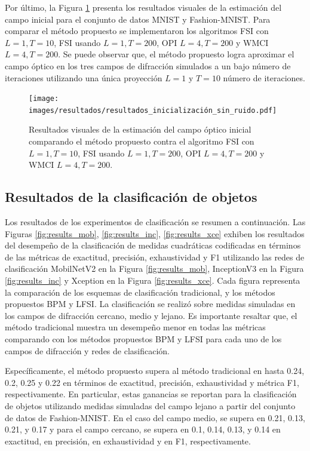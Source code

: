 Por último, la Figura \ref{fig:resultados_inicialización_sin_ruido} presenta los resultados visuales de la estimación del campo inicial para el conjunto de datos MNIST y Fashion-MNIST. Para comparar el método propuesto se implementaron los algoritmos FSI con $L = 1, T = 10$, FSI usando $L = 1, T=200$, OPI $L = 4, T=200$ y WMCI $L = 4, T=200$. Se puede observar que, el método propuesto logra aproximar el campo óptico en los tres campos de difracción simulados a un bajo número de iteraciones utilizando una única proyección $L=1$ y $T=10$ número de iteraciones.

\begin{figure}[!h]
    \centering
    \caption{Resultados visuales de la estimación del campo óptico inicial comparando el método propuesto contra el algoritmo FSI con $L = 1, T = 10$, FSI usando $L = 1, T=200$, OPI $L = 4, T=200$ y WMCI $L = 4, T=200$.}
    \texttt{[image: images/resultados/resultados\_inicialización\_sin\_ruido.pdf]}
    \label{fig:resultados_inicialización_sin_ruido}
\end{figure}

\pagebreak

\subsection{Resultados de la clasificación de objetos}

Los resultados de los experimentos de clasificación se resumen a continuación. Las Figuras \ref{fig:results_mob}, \ref{fig:results_inc},  \ref{fig:results_xce} exhiben los resultados del desempeño de la clasificación de medidas cuadráticas codificadas en términos de las métricas de exactitud, precisión, exhaustividad y F1 utilizando las redes de clasificación MobilNetV2 en la Figura \ref{fig:results_mob}, InceptionV3 en la Figura \ref{fig:results_inc} y Xception en la Figura \ref{fig:results_xce}. Cada figura representa la comparación de los esquemas de clasificación tradicional, y los métodos propuestos BPM y LFSI. La clasificación se realizó sobre medidas simuladas en los campos de difracción cercano, medio y lejano. Es importante resaltar que, el método tradicional muestra un desempeño menor en todas las métricas comparando con los métodos propuestos BPM y LFSI para cada uno de los campos de difracción y redes de clasificación.

Específicamente, el método propuesto supera al método tradicional en hasta 0.24, 0.2, 0.25 y 0.22 en términos de exactitud, precisión, exhaustividad y métrica F1, respectivamente. En particular, estas ganancias se reportan para la clasificación de objetos utilizando medidas simuladas del campo lejano a partir del conjunto de datos de Fashion-MNIST. En el caso del campo medio, se supera en 0.21, 0.13, 0.21, y 0.17 y para el campo cercano, se supera en 0.1, 0.14, 0.13, y 0.14 en exactitud, en precisión, en exhaustividad y en F1, respectivamente. 

